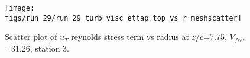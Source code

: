 \begin{figure}[H]
\centering
\texttt{[image: figs/run\_29/run\_29\_turb\_visc\_ettap\_top\_vs\_r\_meshscatter]}
\caption{Scatter plot of $
u_T$ reynolds stress term vs radius at $z/c$=7.75, $V_{free}$=31.26, station 3.}
\label{fig:run_29_turb_visc_ettap_top_vs_r_meshscatter}
\end{figure}


